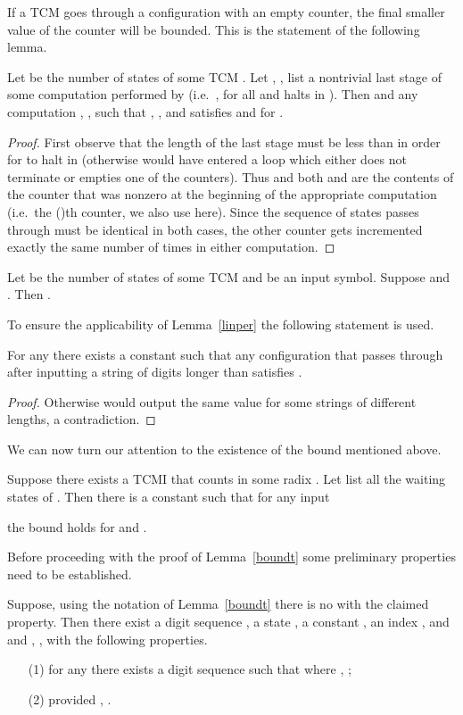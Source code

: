 \documentclass[12pt]{article}
\begin{document}
If a TCM goes through a configuration with an empty counter, the final
smaller value of the counter will be bounded. This is the statement of
the following lemma. 
\begin{lemma}\label{lstg}
Let  be the number of states of some TCM . Let , ,  list a nontrivial last stage of some computation
performed by  (i.e.\ ,  for all  and
 halts in ). Then  and any computation , ,  such that , , and 
satisfies  and  for . 
\end{lemma}
\begin{proof}
First observe that the length of the last stage must be less than
 in order for  to halt in  (otherwise  would have entered a
loop which either does not terminate or empties one of the
counters). Thus  and both  and  are the contents of the counter that was
nonzero at the beginning of the appropriate computation (i.e.\ the
()th
counter, we also use  here). Since the sequence of
states  passes through must be identical in both cases, the other
counter gets incremented exactly the same number of times in either
computation.
\end{proof}

\begin{corollary}\label{zstg}
Let  be the number of states of some TCM  and  be an input symbol. Suppose
 and
. Then .
\end{corollary}

To ensure the applicability of Lemma~\ref{linper} the following
statement is used.
\begin{lemma}\label{lprefix}
For any  there exists a constant  such that any configuration 
that  passes through after inputting a string of digits longer than
 satisfies .
\end{lemma}
\begin{proof}
Otherwise  would output the same value for some strings of
different lengths, a contradiction.
\end{proof}

We can now turn our attention to the existence of the bound mentioned above.
\def\sgn{\mathop{{\rm sgn}}}
\begin{lemma}\label{boundt}
Suppose there exists a TCMI  that counts in some radix . Let
 list all the waiting states of . Then
there is a constant  such that for any input

the bound  holds for  and .
\end{lemma}

Before proceeding with the proof of Lemma~\ref{boundt} some
preliminary properties need to be established.
\begin{lemma}\label{unper}
Suppose, using the notation of Lemma~\ref{boundt} there is no  with
the claimed property. Then there exist a digit sequence , 
a state , a constant , an index ,
and  and , , with the following
properties. 
\begin{itemize}
\item[(1)] for any  there exists a digit sequence  such that
 where ,
;

\item[(2)]
 provided , .

\end{itemize}
\end{lemma}
\end{document}
